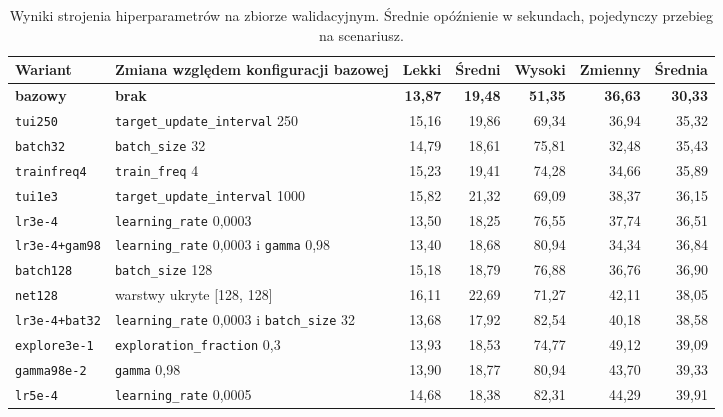 \begin{table}[htbp] \centering
    \caption[Wyniki strojenia hiperparametrów.]{Wyniki strojenia hiperparametrów na zbiorze walidacyjnym. Średnie opóźnienie w sekundach, pojedynczy przebieg na scenariusz.}
    \label{tab:strojenie}
    \footnotesize
    \setlength{\tabcolsep}{4pt}
    \begin{tabular}{| l | l | r | r | r | r | r |} \hline
        Wariant & Zmiana względem konfiguracji bazowej & Lekki & Średni & Wysoki & Zmienny & Średnia \\ \hline\hline
        \textbf{bazowy} & \textbf{brak} & \textbf{13,87} & \textbf{19,48} & \textbf{51,35} & \textbf{36,63} & \textbf{30,33} \\ \hline
        \texttt{tui250}       & \texttt{target\_update\_interval} 250   & 15,16 & 19,86 & 69,34 & 36,94 & 35,32 \\ \hline
        \texttt{batch32}      & \texttt{batch\_size} 32                 & 14,79 & 18,61 & 75,81 & 32,48 & 35,43 \\ \hline
        \texttt{trainfreq4}   & \texttt{train\_freq} 4                  & 15,23 & 19,41 & 74,28 & 34,66 & 35,89 \\ \hline
        \texttt{tui1e3}       & \texttt{target\_update\_interval} 1000  & 15,82 & 21,32 & 69,09 & 38,37 & 36,15 \\ \hline
        \texttt{lr3e-4}       & \texttt{learning\_rate} 0,0003          & 13,50 & 18,25 & 76,55 & 37,74 & 36,51 \\ \hline
        \texttt{lr3e-4+gam98} & \texttt{learning\_rate} 0,0003 i \texttt{gamma} 0,98 & 13,40 & 18,68 & 80,94 & 34,34 & 36,84 \\ \hline
        \texttt{batch128}     & \texttt{batch\_size} 128                & 15,18 & 18,79 & 76,88 & 36,76 & 36,90 \\ \hline
        \texttt{net128}       & warstwy ukryte [128, 128]               & 16,11 & 22,69 & 71,27 & 42,11 & 38,05 \\ \hline
        \texttt{lr3e-4+bat32} & \texttt{learning\_rate} 0,0003 i \texttt{batch\_size} 32 & 13,68 & 17,92 & 82,54 & 40,18 & 38,58 \\ \hline
        \texttt{explore3e-1}  & \texttt{exploration\_fraction} 0,3      & 13,93 & 18,53 & 74,77 & 49,12 & 39,09 \\ \hline
        \texttt{gamma98e-2}   & \texttt{gamma} 0,98                     & 13,90 & 18,77 & 80,94 & 43,70 & 39,33 \\ \hline
        \texttt{lr5e-4}       & \texttt{learning\_rate} 0,0005          & 14,68 & 18,38 & 82,31 & 44,29 & 39,91 \\ \hline

\end{tabular}
\end{table}
